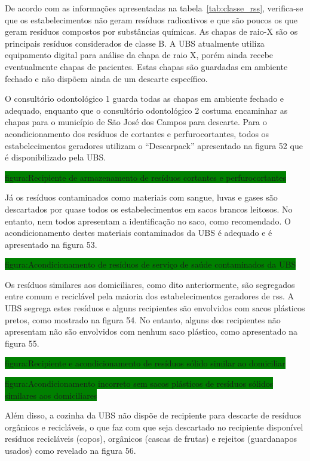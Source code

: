 %	
	
	De acordo com as informações apresentadas na tabela~\ref{tab:classe_rss}, verifica-se que os estabelecimentos não geram resíduos radioativos e que são poucos os que geram resíduos compostos por substâncias químicas. As chapas de raio-X são os principais resíduos considerados de classe B. A UBS atualmente utiliza equipamento digital para análise da chapa de raio X, porém ainda recebe eventualmente chapas de pacientes. Estas chapas são guardadas em ambiente fechado e não dispõem ainda de um descarte específico.
	
	O consultório odontológico 1 guarda todas as chapas em ambiente fechado e adequado, enquanto que o consultório odontológico 2 costuma encaminhar as chapas para o município de São José dos Campos para descarte.
	Para o acondicionamento dos resíduos de cortantes e perfurocortantes, todos os estabelecimentos geradores utilizam o “Descarpack” apresentado na figura 52 que é disponibilizado pela UBS.
	
	\colorbox{green}{figura:Recipiente de armazenamento de resíduos cortantes e perfurocortantes}
	
	Já os resíduos contaminados como materiais com sangue, luvas e gases são descartados por quase todos os estabelecimentos em sacos brancos leitosos. No entanto, nem todos apresentam a identificação no saco, como recomendado. O acondicionamento destes materiais contaminados da UBS é adequado e é apresentado na figura 53.
	
	\colorbox{green}{figura:Acondicionamento de resíduos de serviço de saúde contaminados da UBS}
	
	Os resíduos similares aos domiciliares, como dito anteriormente, são segregados entre comum e reciclável pela maioria dos estabelecimentos geradores de \gls{rss}. A UBS segrega estes resíduos e alguns recipientes são envolvidos com sacos plásticos pretos, como mostrado na figura 54. No entanto, alguns dos recipientes não apresentam não são envolvidos com nenhum saco plástico, como apresentado na figura 55.
	
	\colorbox{green}{figura:Recipiente e acondicionamento de resíduos sólido similar ao domiciliar}
	
	\colorbox{green}{figura:Acondicionamento incorreto sem sacos plásticos de resíduos sólidos similares aos domiciliares}
	
	Além disso, a cozinha da UBS não dispõe de recipiente para descarte de resíduos orgânicos e recicláveis, o que faz com que seja descartado no recipiente disponível resíduos recicláveis (copos), orgânicos (cascas de frutas) e rejeitos (guardanapos usados) como revelado na figura 56. 
	

